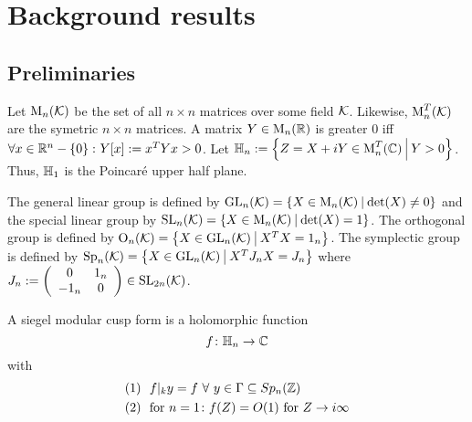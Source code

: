 
\section{Background results}

\subsection{Preliminaries}

Let $\operatorname{M}_n(\mathcal{K})$ be the set of all $n \times n$ matrices over some field $\mathcal{K}$.
Likewise, $\operatorname{M}_n^T(\mathcal{K})$ are the symetric $n \times n$ matrices.
A matrix $Y \in \operatorname{M}_n(\mathbb{R})$ is greater $0$ iff $\forall x \in \R^n - \Set{0} \colon Y[x] := x^T Y x > 0$.
Let $\HalfPlane_n := \Set{Z = X + iY \in \M_n^T(\C)}{Y > 0}$.
Thus, $\mathbb{H}_1$ is the Poincaré upper half plane.

The general linear group is defined by $\GL_n(\K) = \Set{X \in \M_n(\K)}{\det(X) \neq 0}$
and the special linear group by $\SL_n(\K) = \Set{X \in \M_n(\K)}{\det(X) = 1}$.
The orthogonal group is defined by $\Orth_n(\K) = \Set{X \in \GL_n(\K)}{X^T X = 1_n}$.
The symplectic group is defined by $\Sp_n(\K) = \Set{X \in \GL_n(\K)}{X^T J_n X = J_n}$
where $J_n := \left( \begin{array}{ccc}
0 & 1_n \\
-1_n & 0 \end{array} \right) \in \operatorname{SL}_{2n}(\mathcal{K})$.

A siegel modular cusp form is a holomorphic function
\[ f \colon \mathbb{H}_n \rightarrow \mathbb{C} \]
with
\begin{align*}
(1) \ \ & f |_k y = f \ \forall \ y \in \Gamma \subseteq Sp_n(\mathbb{Z}) \\
(2) \ \ & \text{for } n = 1 \colon f(Z) = O(1) \text{ for } Z \rightarrow i \infty
\end{align*}


